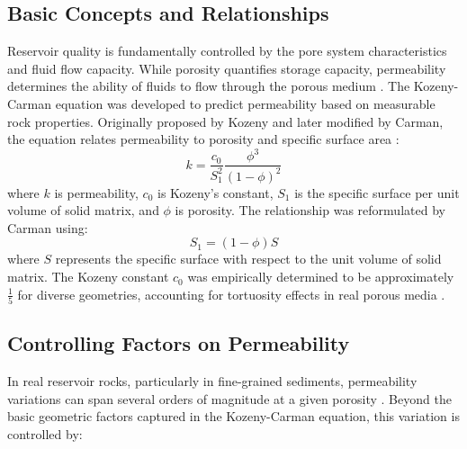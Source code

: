 \documentclass[journal]{IEEEtran}
\begin{document}
\subsection{Basic Concepts and Relationships}
Reservoir quality is fundamentally controlled by the pore system characteristics and fluid flow capacity. While porosity quantifies storage capacity, permeability determines the ability of fluids to flow through the porous medium \parencite{yang_permeabilityporosity_2010}.
The Kozeny-Carman equation was developed to predict permeability based on measurable rock properties. Originally proposed by Kozeny and later modified by Carman, the equation relates permeability to porosity and specific surface area \parencite{chapuis_use_2003}:
\begin{equation}
k = \frac{c_0}{S_1^2}\frac{\phi^3}{(1-\phi)^2}
\end{equation}
\noindent where $k$ is permeability, $c_0$ is Kozeny's constant, $S_1$ is the specific surface per unit volume of solid matrix, and $\phi$ is porosity. The relationship was reformulated by Carman using:
\begin{equation}
S_1 = (1-\phi)S
\end{equation}
\noindent where $S$ represents the specific surface with respect to the unit volume of solid matrix. The Kozeny constant $c_0$ was empirically determined to be approximately $\frac{1}{5}$ for diverse geometries, accounting for tortuosity effects in real porous media \parencite{yang_permeabilityporosity_2010}.

\subsection{Controlling Factors on Permeability}

In real reservoir rocks, particularly in fine-grained sediments, permeability variations can span several orders of magnitude at a given porosity \parencite{yang_permeabilityporosity_2010}. Beyond the basic geometric factors captured in the Kozeny-Carman equation, this variation is controlled by:
\end{document}
